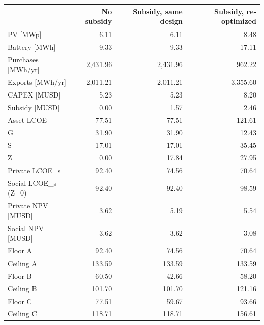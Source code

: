 \begin{tabular}{lrrr}
\toprule
 & No subsidy & Subsidy, same design & Subsidy, re-optimized \\
\midrule
PV [MWp] & 6.11 & 6.11 & 8.48 \\
Battery [MWh] & 9.33 & 9.33 & 17.11 \\
Purchases [MWh/yr] & 2,431.96 & 2,431.96 & 962.22 \\
Exports [MWh/yr] & 2,011.21 & 2,011.21 & 3,355.60 \\
CAPEX [MUSD] & 5.23 & 5.23 & 8.20 \\
Subsidy [MUSD] & 0.00 & 1.57 & 2.46 \\
Asset LCOE & 77.51 & 77.51 & 121.61 \\
G & 31.90 & 31.90 & 12.43 \\
S & 17.01 & 17.01 & 35.45 \\
Z & 0.00 & 17.84 & 27.95 \\
Private LCOE_s & 92.40 & 74.56 & 70.64 \\
Social LCOE_s (Z=0) & 92.40 & 92.40 & 98.59 \\
Private NPV [MUSD] & 3.62 & 5.19 & 5.54 \\
Social NPV [MUSD] & 3.62 & 3.62 & 3.08 \\
Floor A & 92.40 & 74.56 & 70.64 \\
Ceiling A & 133.59 & 133.59 & 133.59 \\
Floor B & 60.50 & 42.66 & 58.20 \\
Ceiling B & 101.70 & 101.70 & 121.16 \\
Floor C & 77.51 & 59.67 & 93.66 \\
Ceiling C & 118.71 & 118.71 & 156.61 \\
\bottomrule
\end{tabular}
